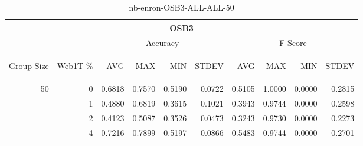 \begin{center}
\begin{table}[htbp] 
 \begin{center}
\begin{tabular}{ | r | r | r | r | r | r | r | r | r | r |}
\hline
\multicolumn{10}{|c|}{OSB3}\\
\hline
 & & \multicolumn{4}{|c|}{Accuracy} & \multicolumn{4}{|c|}{F-Score}\\ \cline{3-10}
\begin{sideways}Group Size\end{sideways} & \begin{sideways}Web1T \%\end{sideways} & \begin{sideways}AVG\end{sideways} & \begin{sideways}MAX\end{sideways} & \begin{sideways}MIN\end{sideways} & \begin{sideways}STDEV\end{sideways} & \begin{sideways}AVG\end{sideways} & \begin{sideways}MAX\end{sideways} & \begin{sideways}MIN\end{sideways} & \begin{sideways}STDEV\end{sideways}\\
\hline
\multirow{3}{*}{50}
 & 0 & 0.6818 & 0.7570 & 0.5190 & 0.0722 & 0.5105 & 1.0000 & 0.0000 & 0.2815\\ \cline{2-10}
 & 1 & 0.4880 & 0.6819 & 0.3615 & 0.1021 & 0.3943 & 0.9744 & 0.0000 & 0.2598\\ \cline{2-10}
 & 2 & 0.4123 & 0.5087 & 0.3526 & 0.0473 & 0.3243 & 0.9730 & 0.0000 & 0.2273\\ \cline{2-10}
 & 4 & 0.7216 & 0.7899 & 0.5197 & 0.0866 & 0.5483 & 0.9744 & 0.0000 & 0.2701\\ \cline{2-10}
\hline
\end{tabular}
\caption{nb-enron-OSB3-ALL-ALL-50}
\label{table:nb-enron-OSB3-ALL-ALL-50}
\end{center}
 \end{table}
\end{center}

